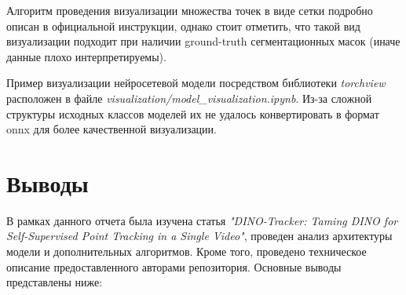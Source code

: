 \documentclass[a4paper, 14pt]{extarticle}
\theoremstyle{definition}
\theoremstyle{plain}
\theoremstyle{remark}
\begin{document}
Алгоритм проведения визуализации множества точек в виде сетки подробно описан в официальной инструкции, однако стоит отметить, что такой вид визуализации подходит при наличии ground-truth сегментационных масок (иначе данные плохо интерпретируемы).

Пример визуализации нейросетевой модели посредством библиотеки \textit{torchview} расположен в файле \textit{visualization/model\_visualization.ipynb}. Из-за сложной структуры исходных классов моделей их не удалось конвертировать в формат onnx для более качественной визуализации.

\newpage


\section{Выводы}

В рамках данного отчета была изучена статья \textit{"DINO-Tracker: Taming DINO for Self-Supervised Point Tracking in a Single Video"}, проведен анализ архитектуры модели и дополнительных алгоритмов. Кроме того, проведено техническое описание предоставленного авторами репозитория. Основные выводы представлены ниже:
\end{document}
